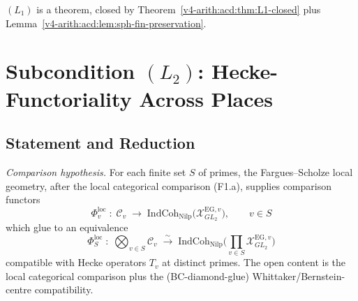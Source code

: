 \begin{corollary}[\((L_{1})\) holds]
\label{v4-arith:acd:cor:L1-holds}
\((L_{1})\) is a theorem, closed by
Theorem~\ref{v4-arith:acd:thm:L1-closed} plus
Lemma~\ref{v4-arith:acd:lem:sph-fin-preservation}.
\end{corollary}

\section{Subcondition \((L_{2})\): Hecke-Functoriality Across Places}
\label{v4-arith:acd:L2}

\subsection{Statement and Reduction}

\begin{theorem}[\((L_{2})\) reduction]
\label{v4-arith:acd:thm:L2-reduction}
\emph{Comparison hypothesis.} For each finite set \(S\) of primes, the
Fargues--Scholze local geometry, after the local categorical comparison
(F1.a), supplies comparison functors
\begin{equation}
\label{v4-arith:acd:eq:local-FS}
\Phi_{v}^{\mathrm{loc}}\;:\;\mathcal{C}_{v}\;\longrightarrow\;\mathrm{IndCoh}_{\mathrm{Nilp}}\bigl(\mathcal{X}^{\mathrm{EG},v}_{GL_{2}}\bigr),\qquad v\in S
\end{equation}
which glue to an equivalence
\begin{equation}
\label{v4-arith:acd:eq:glued-FS}
\Phi_{S}^{\mathrm{loc}}\;:\;\bigotimes_{v\in S}\mathcal{C}_{v}\;\xrightarrow{\sim}\;\mathrm{IndCoh}_{\mathrm{Nilp}}\biggl(\prod_{v\in S}\mathcal{X}^{\mathrm{EG},v}_{GL_{2}}\biggr)
\end{equation}
compatible with Hecke operators \(T_{v}\) at distinct primes. The
open content is the local categorical comparison plus the
(BC-diamond-glue) Whittaker/Bernstein-centre compatibility.
\end{theorem}


